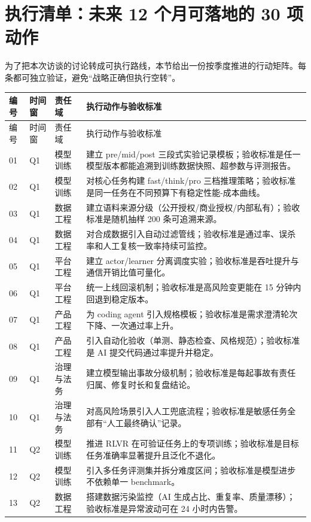 \section{执行清单：未来 12 个月可落地的 30 项动作}

为了把本次访谈的讨论转成可执行路线，本节给出一份按季度推进的行动矩阵。每条都可独立验证，避免“战略正确但执行空转”。

\begin{longtable}{p{}p{}p{}p{}}
\toprule
编号 & 时间窗 & 责任域 & 执行动作与验收标准 \\
\midrule
\endfirsthead
\toprule
编号 & 时间窗 & 责任域 & 执行动作与验收标准 \\
\midrule
\endhead
01 & Q1 & 模型训练 & 建立 pre/mid/post 三段式实验记录模板；验收标准是任一模型版本都能追溯到训练数据快照、超参数与评测报告。 \\
02 & Q1 & 模型训练 & 对核心任务构建 fast/think/pro 三档推理策略；验收标准是同一任务在不同预算下有稳定性能-成本曲线。 \\
03 & Q1 & 数据工程 & 建立语料来源分级（公开授权/商业授权/内部私有）；验收标准是随机抽样 200 条可追溯来源。 \\
04 & Q1 & 数据工程 & 对合成数据引入自动过滤管线；验收标准是通过率、误杀率和人工复核一致率持续可监控。 \\
05 & Q1 & 平台工程 & 建立 actor/learner 分离调度实验；验收标准是吞吐提升与通信开销比值可量化。 \\
06 & Q1 & 平台工程 & 统一上线回滚机制；验收标准是高风险变更能在 15 分钟内回退到稳定版本。 \\
07 & Q1 & 产品工程 & 为 coding agent 引入规格模板；验收标准是需求澄清轮次下降、一次通过率上升。 \\
08 & Q1 & 产品工程 & 引入自动化验收（单测、静态检查、风格规范）；验收标准是 AI 提交代码通过率提升并稳定。 \\
09 & Q1 & 治理与法务 & 建立模型输出事故分级机制；验收标准是每起事故有责任归属、修复时长和复盘结论。 \\
10 & Q1 & 治理与法务 & 对高风险场景引入人工兜底流程；验收标准是敏感任务全部有“人工最终确认”记录。 \\
11 & Q2 & 模型训练 & 推进 RLVR 在可验证任务上的专项训练；验收标准是目标任务准确率显著提升且泛化不退化。 \\
12 & Q2 & 模型训练 & 引入多任务评测集并拆分难度区间；验收标准是模型进步不依赖单一 benchmark。 \\
13 & Q2 & 数据工程 & 搭建数据污染监控（AI 生成占比、重复率、质量漂移）；验收标准是异常波动可在 24 小时内告警。 \\

\end{longtable}
